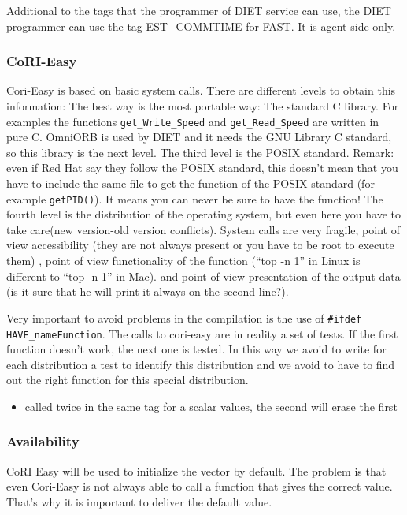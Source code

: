   Additional to the tags that the programmer of DIET
  service can use, the DIET programmer can use 
  the tag EST\_COMMTIME for FAST. It is agent side only. 

  \subsubsection{CoRI-Easy}
  Cori-Easy is based on basic system calls. There are different
   levels to obtain this information: 
  The best way is the most portable way: The standard C library. For examples the
  functions \texttt{get\_Write\_Speed} and \texttt{get\_Read\_Speed} are written in pure C.
  OmniORB is used by DIET and it needs the GNU Library C standard, 
  so this library is the next level.
  The third level is the POSIX standard. Remark: even if Red Hat 
  say they follow the POSIX standard, this doesn't mean that you have to include the same file
  to get the function of the POSIX standard (for example \texttt{getPID()}). 
  It means you can never be sure to have the function!
  The fourth level is the distribution of the operating system, 
  but even here you have to take care(new version-old version conflicts). 
  System calls are very fragile, point of view accessibility 
  (they are not always present or you have to be root to execute them)
  , point of view functionality of the function (``top -n 1'' 
  in Linux is different to ``top -n 1'' in Mac).
  and point of view presentation of the output data (is it sure that 
  he will print it always on the second line?).

  Very important to avoid problems in the compilation is the use of 
   \texttt{\#ifdef HAVE\_nameFunction}.  
  The calls to cori-easy are in reality a set of tests. If the first function doesn't work,
  the next one is tested. In this way we avoid to write for each 
  distribution a test to identify this distribution and we avoid to 
  have to find out the right function for this special distribution.

  \begin{itemize}
 \item called twice in the same tag for a scalar values, the second will erase the first
  \end{itemize} 

\subsubsection{Availability}
CoRI Easy will be used to initialize the vector by default. The problem is that even Cori-Easy is not always able to call a function that gives the correct value. That's why it is important to deliver the default value.
